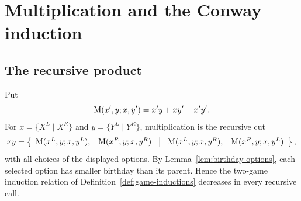 \chapter{Multiplication and the Conway induction}

\section{The recursive product}

\begin{definition}
  \label{def:game-mul}
  \leanok
  Put
  \[
    \operatorname{M}(x',y;x,y')=x'y+xy'-x'y'.
  \]
  For \(x=\{X^L\mid X^R\}\) and \(y=\{Y^L\mid Y^R\}\), multiplication is the recursive cut
  \[
    xy=
    \left\{
      \begin{array}{ll}
        \operatorname{M}(x^L,y;x,y^L),&\operatorname{M}(x^R,y;x,y^R)
      \end{array}
      \ \middle|\
      \begin{array}{ll}
        \operatorname{M}(x^L,y;x,y^R),&\operatorname{M}(x^R,y;x,y^L)
      \end{array}
    \right\},
  \]
  with all choices of the displayed options.  By
  Lemma~\ref{lem:birthday-options}, each selected option has smaller birthday
  than its parent.  Hence the two-game induction relation of
  Definition~\ref{def:game-inductions} decreases in every recursive call.
\end{definition}

